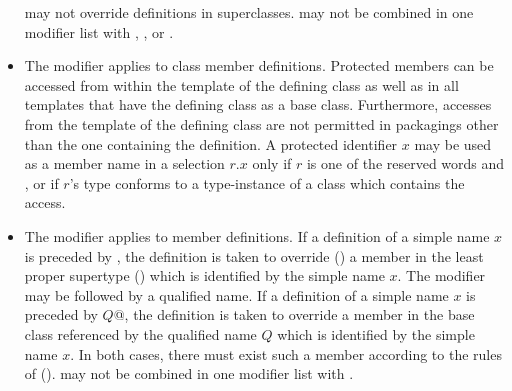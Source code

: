 \documentclass[11pt]{report}
\newcommand{\ifqualified}[1]{}
\begin{document}
\begin{itemize}
may not override definitions in superclasses.
\verb@private@ may not be combined in one modifier list with
\verb@protected@, \verb@abstract@, \verb@final@ or
\verb@override@.
\item
The \verb@protected@ modifier applies to class member definitions.
Protected members can be accessed from within the template of the defining
class as well as in all templates that have the defining class as a base class.
Furthermore, accesses from the template of the defining class are not
permitted in packagings other than the one
containing the definition.  A protected identifier $x$ may be used as
a member name in a selection $r.x$ only if $r$ is one of the reserved
words \verb@this@ and
\verb@super@, or if $r$'s type conforms to a type-instance of a class
which contains the access.
\item
The \verb@override@ modifier applies to member definitions.  If a
definition of a simple name $x$ is preceded by
\verb@override@, the definition is taken to override
() a member in the least proper supertype
() which is identified by the simple name $x$.
The \verb@override@ modifier may be followed by a qualified name.  If
a definition of a simple name $x$ is preceded by
\verb@override $Q$@, the definition is taken to override
a member in the base class referenced by the qualified name $Q$ which
is identified by the simple name $x$.  In both cases, there must exist
such a member according to the rules of ().
\verb@override@ may not be combined in one modifier list with
\verb@private@.
\ifqualified{
\item
The \verb@qualified@ modifier applies to class or module
definitions. When present, all non-overriding member definitions of
the class or module (named $M$, say) introduce names which are
qualified by $M$.  When absent, non-overriding member definitions of
the class or module introduce names which are qualified by the empty
string $\epsilon$.
}
\end{itemize}

\end{document}
